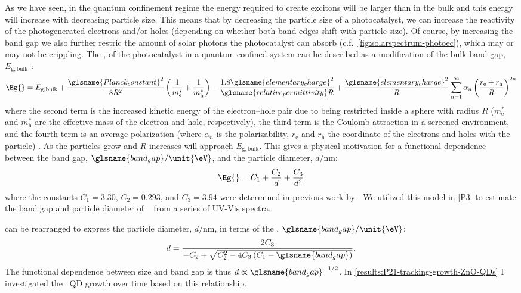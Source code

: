 \documentclass[webedition,openright,titles,swedish,english]{LuaUUThesis}\usepackage[]{graphicx}\usepackage[]{xcolor}
\newcommand{\cf}{c.f.}
\begin{document}
As we have seen, in the quantum confinement regime the energy required to create excitons
will be larger than in the bulk and this energy will increase with decreasing particle size.
This means that by decreasing the particle size of a photocatalyst, we
can increase the reactivity of the photogenerated electrons and/or holes (depending
on whether both band edges shift with particle size).
Of course, by increasing the band gap we also further restric the amount of
solar photons the photocatalyst can absorb (\cf\ \cref{fig:solarspectrum-photoec}),
which may or may not be crippling.
%
The , of the photocatalyst in a quantum-confined system can be described as
a modification of the bulk band gap, $E_\mathrm{g,bulk}$ \cite{Edvinsson2018}:
\begin{equation}\label{eq:Eg-quantum-confined}
\Eg{} = E_\mathrm{g,bulk} +
   \frac{\glsname{Planck_constant}^2}{8R^2}\left(\frac{1}{m_\mathrm{e}^\ast} + \frac{1}{m_\mathrm{h}^\ast}\right) -
   \frac{1.8\glsname{elementary_charge}^2}{\glsname{relative_permittivity}R} +
   \frac{\glsname{elementary_charge}^2}{R}\sum_{n=1}^{\infty}\alpha_n\left(\frac{r_\mathrm{e} + r_\mathrm{h}}{R}\right)^{2n}
\end{equation}
where the second term is the increased kinetic energy of the electron--hole pair
due to being restricted inside a sphere with radius $R$
($m_\mathrm{e}^\ast$ and $m_\mathrm{h}^\ast$ are the effective mass of the electron and hole, respectively),
the third term is the Coulomb attraction in a screened environment,
and the fourth term is an average polarization
(where $\alpha_n$ is the polarizability, $r_\mathrm{e}$ and $r_\mathrm{h}$ the coordinate
of the electrons and holes with the particle) \cite{Edvinsson2018}.
As the particles grow and $R$ increases  will approach $E_\mathrm{g,bulk}$.
This gives a physical motivation for a functional dependence between the
band gap, $\glsname{band_gap}/\unit{\eV}$, and the particle diameter, $d/\unit{\nm}$:
\begin{equation}\label{eq:Eg-from-diameter}
\Eg{} = C_1 + \frac{C_2}{d} + \frac{C_3}{d^2}
\end{equation}
where the constants $C_1=\num{3.30}$, $C_2=\num{0.293}$, and $C_3=\num{3.94}$ were
determined in previous work by \textcite{Jacobsson2011}.
We utilized this model in \cref{P3} to estimate the band gap and particle diameter
of \ZnO\  from a series of \gls{UV-Vis} spectra.

 can be rearranged to express the particle diameter, $d/\unit{\nm}$,
in terms of the , $\glsname{band_gap}/\unit{\eV}$:
\begin{equation}\label{eq:diameter-from-Eg}
d = \frac{2C_3}{-C_2 + \sqrt{C_2^2 - 4C_3\left(C_1 - \glsname{band_gap}\right)}}.
\end{equation}
The functional dependence between size and band gap is thus $d\propto\glsname{band_gap}^{-1/2}$.
In \cref{results:P21-tracking-growth-ZnO-QDs} I investigated the \ZnO\ \gls{QD} growth
over time based on this relationship.
\end{document}
